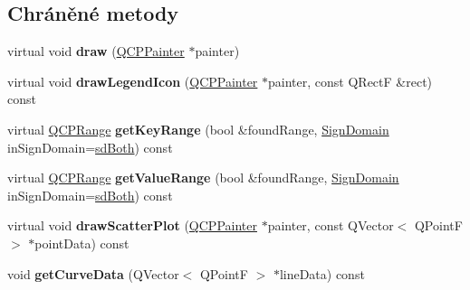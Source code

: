 \subsection*{Chráněné metody}
\begin{DoxyCompactItemize}
\item 
\hypertarget{classQCPCurve_a2361302d2fc6ec669849bd3bca00c4b2}{}virtual void {\bfseries draw} (\hyperlink{classQCPPainter}{Q\+C\+P\+Painter} $\ast$painter)\label{classQCPCurve_a2361302d2fc6ec669849bd3bca00c4b2}

\item 
\hypertarget{classQCPCurve_aaee24451e0044d1debfa1fee92c58d7b}{}virtual void {\bfseries draw\+Legend\+Icon} (\hyperlink{classQCPPainter}{Q\+C\+P\+Painter} $\ast$painter, const Q\+Rect\+F \&rect) const \label{classQCPCurve_aaee24451e0044d1debfa1fee92c58d7b}

\item 
\hypertarget{classQCPCurve_ad6a9559e16ab43586df18ae376d54481}{}virtual \hyperlink{classQCPRange}{Q\+C\+P\+Range} {\bfseries get\+Key\+Range} (bool \&found\+Range, \hyperlink{classQCPAbstractPlottable_a661743478a1d3c09d28ec2711d7653d8}{Sign\+Domain} in\+Sign\+Domain=\hyperlink{classQCPAbstractPlottable_a661743478a1d3c09d28ec2711d7653d8a082b98cfb91a7363a3b5cd17b0c1cd60}{sd\+Both}) const \label{classQCPCurve_ad6a9559e16ab43586df18ae376d54481}

\item 
\hypertarget{classQCPCurve_a1d6eec81aab9ae6182bb7c040bcb2dbc}{}virtual \hyperlink{classQCPRange}{Q\+C\+P\+Range} {\bfseries get\+Value\+Range} (bool \&found\+Range, \hyperlink{classQCPAbstractPlottable_a661743478a1d3c09d28ec2711d7653d8}{Sign\+Domain} in\+Sign\+Domain=\hyperlink{classQCPAbstractPlottable_a661743478a1d3c09d28ec2711d7653d8a082b98cfb91a7363a3b5cd17b0c1cd60}{sd\+Both}) const \label{classQCPCurve_a1d6eec81aab9ae6182bb7c040bcb2dbc}

\item 
\hypertarget{classQCPCurve_a45593f30b81beec4b6130b6b53306087}{}virtual void {\bfseries draw\+Scatter\+Plot} (\hyperlink{classQCPPainter}{Q\+C\+P\+Painter} $\ast$painter, const Q\+Vector$<$ Q\+Point\+F $>$ $\ast$point\+Data) const \label{classQCPCurve_a45593f30b81beec4b6130b6b53306087}

\item 
\hypertarget{classQCPCurve_afa895f8ba9ae34fea6ecea295fd7b1e5}{}void {\bfseries get\+Curve\+Data} (Q\+Vector$<$ Q\+Point\+F $>$ $\ast$line\+Data) const \label{classQCPCurve_afa895f8ba9ae34fea6ecea295fd7b1e5}


\end{DoxyCompactItemize}
